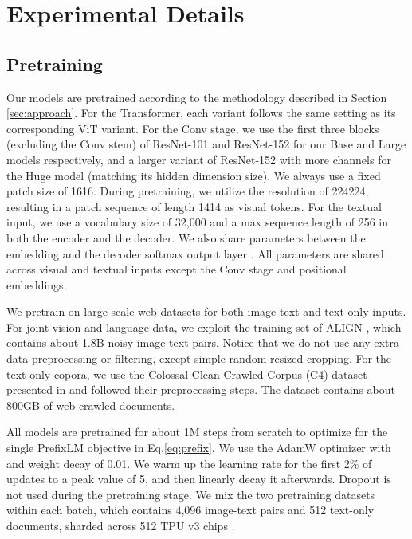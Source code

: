 \documentclass{article} \usepackage{iclr2022_conference,times}
\begin{document}
\section{Experimental Details}

\subsection{Pretraining}\label{sec:pretrain}

Our models are pretrained according to the methodology described in Section \ref{sec:approach}.
For the Transformer,
each variant follows the same setting as its corresponding ViT variant.
For the Conv stage,
we use the first three blocks (excluding the Conv stem) of ResNet-101 and ResNet-152 \citep{he2016deep} for our Base and Large models respectively,
and a larger variant of ResNet-152 with more channels for the Huge model (matching its hidden dimension size).
We always use a fixed patch size of 1616.
During pretraining,
we utilize the resolution of 224224,
resulting in a patch sequence of length 1414 as visual tokens.
For the textual input,
we use a vocabulary size of 32,000 and a max sequence length of 256 in both the encoder and the decoder.
We also share parameters between the embedding and the decoder softmax output layer \citep{press2016using}.
All parameters are shared across visual and textual inputs except the Conv stage and positional embeddings.

We pretrain on large-scale web datasets for both image-text and text-only inputs.
For joint vision and language data,
we exploit the training set of ALIGN \citep{jia2021scaling},
which contains about 1.8B noisy image-text pairs.
Notice that we do not use any extra data preprocessing or filtering,
except simple random resized cropping.
For the text-only copora,
we use the Colossal Clean Crawled Corpus (C4) dataset presented in \cite{raffel2019exploring} and followed their preprocessing steps.
The dataset contains about 800GB of web crawled documents.

All models are pretrained for about 1M steps from scratch to optimize for the single PrefixLM objective in Eq.\ref{eq:prefix}.
We use the AdamW optimizer \citep{loshchilov2017decoupled} with  and weight decay of 0.01.
We warm up the learning rate for the first 2\% of updates to a peak value of 5, and then linearly decay it afterwards.
Dropout is not used during the pretraining stage.
We mix the two pretraining datasets within each batch, which contains 4,096 image-text pairs and 512 text-only documents, sharded across 512 TPU v3 chips \citep{jouppi2017indatacenter}.
\end{document}

